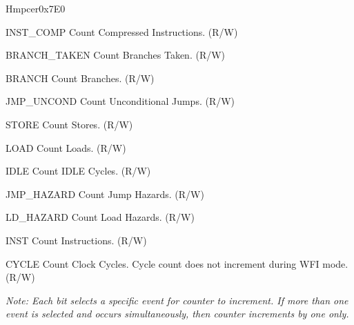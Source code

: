 \begin{register}{H}{mpcer}{0x7E0}\label{regdesc:MPCER}
%
%
%
%
%
%
%
%
%
%
%
%
\regnewline%
\begin{regdesc}\begin{reglist}
\label{fielddesc:INST_COMP}\item [INST\_COMP] Count Compressed Instructions. (R/W)
\label{fielddesc:BRANCH_TAKEN}\item [BRANCH\_TAKEN] Count Branches Taken. (R/W)  
\label{fielddesc:BRANCH}\item [BRANCH] Count Branches. (R/W) 
\label{fielddesc:JUMP_UNCONDITIONAL}\item [JMP\_UNCOND] Count Unconditional Jumps. (R/W) 
\label{fielddesc:STORE}\item [STORE] Count Stores. (R/W) 
\label{fielddesc:LOAD}\item  [LOAD] Count Loads. (R/W) 
\label{fielddesc:IDLE}\item  [IDLE] Count IDLE Cycles. (R/W) 
\label{fielddesc:JUMP_HAZARDS}\item  [JMP\_HAZARD] Count Jump Hazards. (R/W) 
\label{fielddesc:LOAD_HAZARDS}\item  [LD\_HAZARD] Count Load Hazards. (R/W) 
\label{fielddesc:INSTRUCTION}\item  [INST] Count Instructions. (R/W) 
\label{fielddesc:CYCLES}\item  [CYCLE] Count Clock Cycles. Cycle count does not increment during WFI mode. (R/W)

\textit{Note: Each bit selects a specific event for counter to increment. If more than one event is selected and occurs simultaneously, then counter increments by one only.}

\end{reglist}\end{regdesc}
\end{register}

